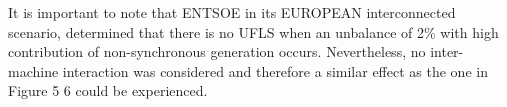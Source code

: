 It is important to note that ENTSOE in its EUROPEAN interconnected scenario, determined that there is no UFLS when an unbalance of 2\% with high contribution of non-synchronous generation occurs. Nevertheless, no inter-machine interaction was considered and therefore a similar effect as the one in Figure 5 6 could be experienced.

